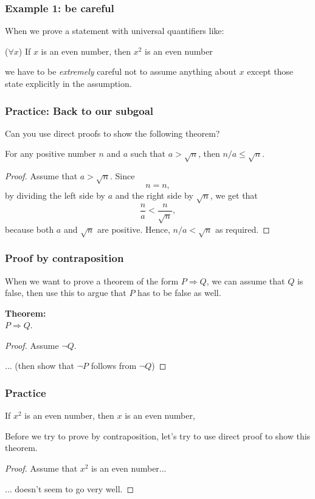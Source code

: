 \begin{frame}\frametitle{Example 1: be careful}
  When we prove a statement with universal quantifiers like:

  \begin{tcolorbox}
    ($\forall x$) If $x$ is an even number, then $x^2$ is an even
    number
  \end{tcolorbox}

  we have to be {\em extremely} careful not to assume anything about
  $x$ except those state explicitly in the assumption.
\end{frame}

\begin{frame}\frametitle{Practice: Back to our subgoal}
  Can you use direct proofs to show the following theorem?

  \begin{theorem}
    For any positive number $n$ and $a$ such that $a > \sqrt{n}$, then
    $n/a\leq\sqrt{n}$.
  \end{theorem} \pause

  \begin{proof}
    Assume that $a > \sqrt{n}$. \pause
    Since
    \[ n = n, \]
    by dividing the left side by $a$ and the right side by $\sqrt{n}$,
    we get that
    \[ \frac{n}{a} < \frac{n}{\sqrt{n}}, \]
    because both $a$ and $\sqrt{n}$ are positive.  Hence, $n/a <
    \sqrt{n}$ as required.
  \end{proof}
\end{frame}

\begin{frame}\frametitle{Proof by contraposition}
  When we want to prove a theorem of the form $P\Rightarrow Q$, we can
  assume that $Q$ is false, then use this to argue that $P$ has to be
  false as well.

  \begin{tcolorbox}[title=Proof by contraposition]
    {\bf Theorem:} \\
    $P\Rightarrow Q$.
    \begin{proof}
      Assume $\neg Q$.
      
      ... (then show that $\neg P$ follows from $\neg Q$)
    \end{proof}
  \end{tcolorbox}
\end{frame}

\begin{frame}\frametitle{Practice}
  \begin{theorem}
    If $x^2$ is an even number, then $x$ is an even number, 
  \end{theorem} \pause

  Before we try to prove by contraposition, let's try to use direct
  proof to show this theorem. \pause

  \begin{proof}
    Assume that $x^2$ is an even number...

    \vspace{1.2in} \pause

    ... doesn't seem to go very well.
  \end{proof}
\end{frame}

